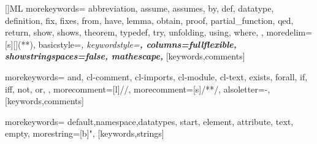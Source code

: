 \RequirePackage{listings}
% 
% 
% 
% 

[]{ML}%
{morekeywords={%
abbreviation,%
assume,%
assumes,%
by,%
def,%
datatype,%
definition,%
fix,%
fixes,%
from,%
have,%
lemma,%
obtain,%
proof,%
partial\_function,%
qed,%
return,%
show,%
shows,%
theorem,%
typedef,%
try,%
unfolding,%
using,%
where,%
},
moredelim=[s][\color{IsabelleStringBackground}]{(*}{*)},
basicstyle=\itshape,%
keywordstyle=\upshape\bfseries,%
columns=fullflexible,%
showstringspaces=false,%
mathescape,%
}[keywords,comments]


%
{morekeywords={%
and,%
cl-comment,%
cl-imports,%
cl-module,%
cl-text,%
exists,%
forall,%
if,%
iff,%
not,%
or,%
},
morecomment=[l]{//},%
morecomment=[s]{/*}{*/},%
alsoletter=-,%
}[keywords,comments]

%
{morekeywords={%
default,namespace,datatypes,%
start,%
element,%
attribute,%
text,%
empty},
morestring=[b]",%
}[keywords,strings]

